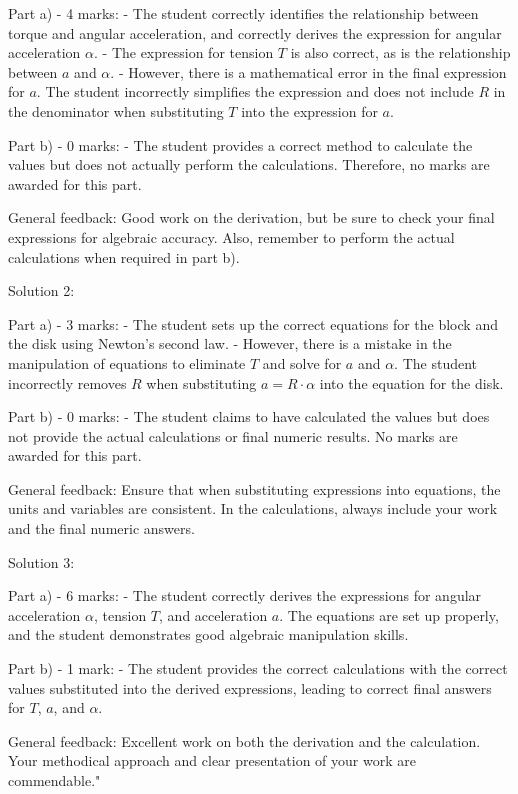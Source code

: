 \documentclass[a4paper,11pt]{article}
\begin{document}
Part a) - 4 marks:
- The student correctly identifies the relationship between torque and angular acceleration, and correctly derives the expression for angular acceleration \( \alpha \).
- The expression for tension \( T \) is also correct, as is the relationship between \( a \) and \( \alpha \).
- However, there is a mathematical error in the final expression for \( a \). The student incorrectly simplifies the expression and does not include \( R \) in the denominator when substituting \( T \) into the expression for \( a \).

Part b) - 0 marks:
- The student provides a correct method to calculate the values but does not actually perform the calculations. Therefore, no marks are awarded for this part.

General feedback: Good work on the derivation, but be sure to check your final expressions for algebraic accuracy. Also, remember to perform the actual calculations when required in part b).

Solution 2:

Part a) - 3 marks:
- The student sets up the correct equations for the block and the disk using Newton's second law.
- However, there is a mistake in the manipulation of equations to eliminate \( T \) and solve for \( a \) and \( \alpha \). The student incorrectly removes \( R \) when substituting \( a = R \cdot \alpha \) into the equation for the disk.

Part b) - 0 marks:
- The student claims to have calculated the values but does not provide the actual calculations or final numeric results. No marks are awarded for this part.

General feedback: Ensure that when substituting expressions into equations, the units and variables are consistent. In the calculations, always include your work and the final numeric answers.

Solution 3:

Part a) - 6 marks:
- The student correctly derives the expressions for angular acceleration \( \alpha \), tension \( T \), and acceleration \( a \). The equations are set up properly, and the student demonstrates good algebraic manipulation skills.

Part b) - 1 mark:
- The student provides the correct calculations with the correct values substituted into the derived expressions, leading to correct final answers for \( T \), \( a \), and \( \alpha \).

General feedback: Excellent work on both the derivation and the calculation. Your methodical approach and clear presentation of your work are commendable."
\end{document}
